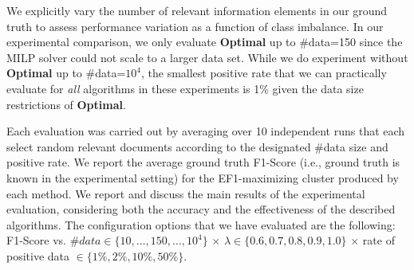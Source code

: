 We explicitly vary the number of relevant information elements in our ground truth to assess performance variation as a function of class imbalance.
In our experimental comparison, we only  
evaluate {\bf Optimal} up to \#data=150 since the MILP solver could not scale to a larger data set.  While we do experiment without {\bf Optimal} up to \#data=$10^4$, the smallest positive rate that we can practically evaluate for \emph{all} algorithms in these experiments is 1\% given the data size restrictions of {\bf Optimal}.

Each evaluation was carried out by averaging over 10 independent runs that each select random relevant documents according to the designated \#data size and positive rate.  We report the average ground truth F1-Score (i.e., ground truth is known in the experimental setting) for the EF1-maximizing cluster produced by each method. %
We report and discuss the main results of the experimental evaluation, considering both the accuracy and the effectiveness of the described algorithms. The configuration options that we have evaluated are the following: F1-Score vs. $\#data \in \{10,\dots, 150,\dots, 10^4\}$ $\times$ $ \lambda \in \{  0.6,0.7,0.8,0.9,1.0 \}$ $\times$ rate of positive data $\in \{1\%, 2\%, 10\%, 50\%\}$. %










